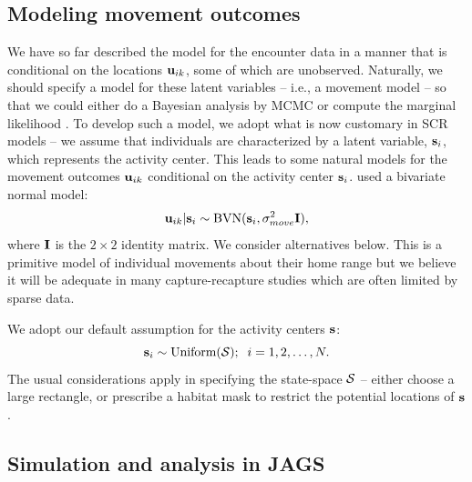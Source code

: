 \subsection{Modeling movement outcomes}

We have so far described the model for the encounter data in a manner
that is conditional on the locations ${\bf u}_{ik}$, some of which are
unobserved. Naturally, we should specify a model for these latent
variables -- i.e., a movement model -- so that we could either do a
Bayesian analysis by MCMC \citep{royle_young:2008, royle_etal:2011mee} or
compute the marginal likelihood \citep{efford:2011}.  To develop such
a model, we adopt what is now customary in SCR models -- we assume
that individuals are characterized by a latent variable, ${\bf
  s}_{i}$, which represents the activity center.  This leads to some
natural models for the movement outcomes ${\bf u}_{ik}$ conditional on
the activity center ${\bf s}_{i}$. \citet{royle_young:2008}
used a bivariate
normal model:
\[
 {\bf u}_{ik} | {\bf s}_{i} \sim \mbox{BVN}({\bf s}_{i}, \sigma_{move}^{2}{\bf I}),
\]
where ${\bf I}$ is the $2\times 2$ identity matrix. We consider
alternatives
below.
This is a primitive model of individual movements about their home
range but we believe it will be adequate in many capture-recapture
studies which are often limited by sparse data.

We adopt our default assumption for the activity centers ${\bf s}$:
\[
 {\bf s}_{i} \sim \mbox{Uniform}({\cal S}); \; \; i=1,2,\ldots,N.
\]
The usual considerations apply in specifying the state-space ${\cal
  S}$ -- either choose a large rectangle, or prescribe a habitat mask
to restrict the potential locations of ${\bf s}$.



\subsection{Simulation and analysis in {\bf JAGS}}

